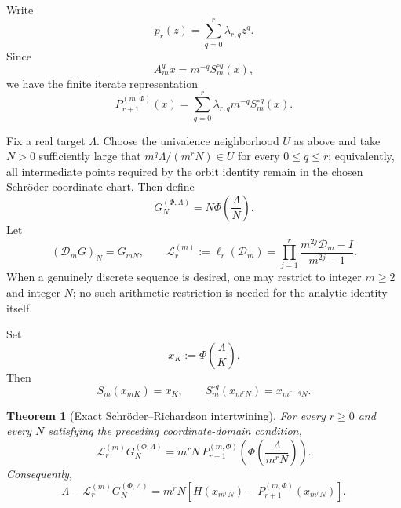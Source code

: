 \documentclass[11pt]{article}
\newtheorem{theorem}{Theorem}[section]
\theoremstyle{remark}
\newcommand{\D}{\mathcal D}
\newcommand{\Lop}{\mathcal L}
\begin{document}
Write
\begin{equation}
p_r(z)=\sum_{q=0}^r\lambda_{r,q}z^q.
\label{eq:lambdas}
\end{equation}
Since
\begin{equation}
A_m^q x
=
m^{-q}S_m^{\circ q}(x),
\label{eq:Aiterate}
\end{equation}
we have the finite iterate representation
\begin{equation}
\boxed{
P_{r+1}^{(m,\Phi)}(x)
=
\sum_{q=0}^r
\lambda_{r,q}m^{-q}S_m^{\circ q}(x).
}
\label{eq:finiteIterate}
\end{equation}

Fix a real target \(\Lambda\).  Choose the univalence neighborhood
\(U\) as above and take \(N>0\) sufficiently large that
\(m^q\Lambda/(m^rN)\in U\) for every \(0\le q\le r\); equivalently, all
intermediate points required by the orbit identity remain in the chosen
Schr\"oder coordinate chart.  Then define
\begin{equation}
G_N^{(\Phi,\Lambda)}
=
N\Phi\!\left(\frac{\Lambda}{N}\right).
\label{eq:Ggeneral}
\end{equation}
Let
\begin{equation}
(\D_mG)_N=G_{mN},
\qquad
\Lop_r^{(m)}
:=
\ell_r(\D_m)
=
\prod_{j=1}^r
\frac{m^{2j}\D_m-I}{m^{2j}-1}.
\label{eq:Ldef}
\end{equation}
When a genuinely discrete sequence is desired, one may restrict to
integer \(m\ge2\) and integer \(N\); no such arithmetic restriction is
needed for the analytic identity itself.

Set
\begin{equation}
x_K:=\Phi\!\left(\frac{\Lambda}{K}\right).
\label{eq:xK}
\end{equation}
Then
\begin{equation}
S_m(x_{mK})=x_K,
\qquad
S_m^{\circ q}(x_{m^rN})=x_{m^{r-q}N}.
\label{eq:orbit}
\end{equation}

\begin{theorem}[Exact Schr\"oder--Richardson intertwining]
\label{thm:intertwine}
For every \(r\ge0\) and every \(N\) satisfying the preceding
coordinate-domain condition,
\begin{equation}
\boxed{
\Lop_r^{(m)}G_N^{(\Phi,\Lambda)}
=
m^rN\,
P_{r+1}^{(m,\Phi)}
\!\left(
\Phi\!\left(\frac{\Lambda}{m^rN}\right)
\right).
}
\label{eq:intertwine}
\end{equation}
Consequently,
\begin{equation}
\boxed{
\Lambda-
\Lop_r^{(m)}G_N^{(\Phi,\Lambda)}
=
m^rN
\left[
H(x_{m^rN})-
P_{r+1}^{(m,\Phi)}(x_{m^rN})
\right].
}
\label{eq:defectIntertwine}
\end{equation}
\end{theorem}
\end{document}
